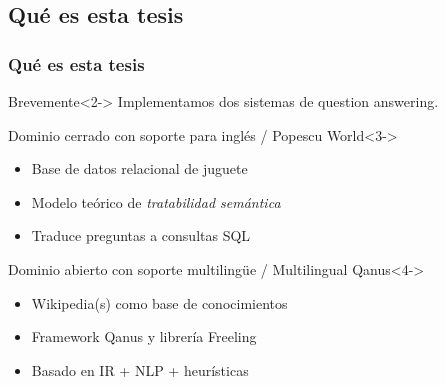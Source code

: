 \subsection{Qué es esta tesis}

\begin{frame}
  \frametitle{Qué es esta tesis}
    \begin{block}{Brevemente}<2->
      Implementamos dos sistemas de question answering.
    \end{block}
    \begin{exampleblock}{Dominio cerrado con soporte para inglés / Popescu World}<3->
      \begin{itemize}
          \item Base de datos relacional de juguete
          \item Modelo teórico de \textit{tratabilidad semántica}
          \item Traduce preguntas a consultas SQL
      \end{itemize}
    \end{exampleblock}
    \begin{alertblock}{Dominio abierto con soporte multilingüe / Multilingual Qanus}<4->
      \begin{itemize}
          \item Wikipedia(s) como base de conocimientos
          \item Framework Qanus y librería Freeling
          \item Basado en IR + NLP + heurísticas
      \end{itemize}
    \end{alertblock}
\end{frame}